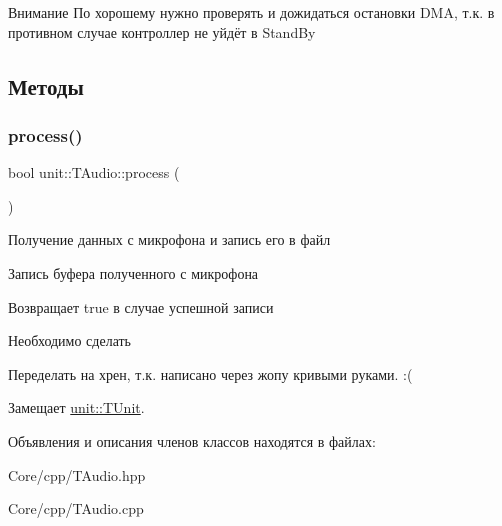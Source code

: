 \begin{DoxyAttention}{Внимание}
По хорошему нужно проверять и дожидаться остановки D\+MA, т.\+к. в противном случае контроллер не уйдёт в Stand\+By 
\end{DoxyAttention}


\subsection{Методы}
\mbox{\label{classunit_1_1_t_audio_ad547ef4d28534b9cd76d2e7eb539d1e0}} 
\subsubsection{\texorpdfstring{process()}{process()}}
{\footnotesize\ttfamily bool unit\+::\+T\+Audio\+::process (\begin{DoxyParamCaption}{ }\end{DoxyParamCaption})\hspace{0.3cm}{\ttfamily [virtual]}}



Получение данных с микрофона и запись его в файл 



 Запись буфера полученного с микрофона \begin{DoxyReturn}{Возвращает}
true в случае успешной записи 
\end{DoxyReturn}
\begin{DoxyRefDesc}{Необходимо сделать}
\item[\hyperlink{todo__todo000005}{Необходимо сделать}]Переделать на хрен, т.\+к. написано через жопу кривыми руками. \+:( \end{DoxyRefDesc}


Замещает \hyperlink{classunit_1_1_t_unit_a108691c8b988d97c65237c83a31db706}{unit\+::\+T\+Unit}.



Объявления и описания членов классов находятся в файлах\+:\begin{DoxyCompactItemize}
\item 
Core/cpp/T\+Audio.\+hpp\item 
Core/cpp/T\+Audio.\+cpp\end{DoxyCompactItemize}
